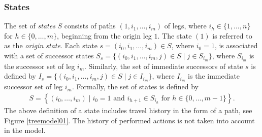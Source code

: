 \documentclass[dissertation,draft*]{aaltoseries}
\begin{document}
\subsubsection{States}
\label{statesdef}
The set of \emph{states} $S$ consists of paths $(1,i_1,\ldots,i_m)$ of legs, where $i_h \in \{1,\ldots,n\}$ for $h \in \{0,\ldots,m\}$,
beginning from the origin leg $1$. The state $(1)$ is referred to as the \emph{origin state}.
Each state $s=(i_0,i_1,\ldots,i_m) \in S$, where $i_0=1$, is associated with a set of successor states
$S_{s} = \{(i_0,i_1,\ldots,i_m,j)\in S \mid j \in S_{i_m} \}$, where $S_{i_m}$ is the successor set of leg $i_m$.
Similarly, the set of immediate successors of state $s$ is defined by
$I_{s} = \{(i_0,i_1,\ldots,i_m,j)\in S \mid j \in I_{i_m} \}$, where $I_{i_m}$ is the immediate successor set of leg $i_m$.
Formally, the set of states is defined by
\begin{align}
\label{statejoukko}
 S=\left\{(i_0,\ldots,i_m) \mid i_0=1 \mbox{ and } i_{h+1} \in S_{i_h} \mbox{ for } h \in \{0,\ldots,m-1\} \right\}.
\end{align}
The above definition of a state includes travel history in the form of a path, see Figure \ref{treemodel01}. 
The history of performed actions is not taken into account in the model.
\end{document}
